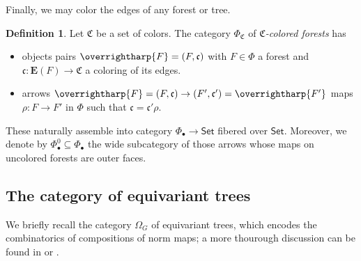 \documentclass[a4paper,10pt
,draft
]{article}%
\numberwithin{equation}{section}
\numberwithin{figure}{section}
\theoremstyle{definition} %
\newtheorem{definition}[equation]{Definition}%
\newcommand{\vect}[1]{\text{\overrightharp{\ensuremath{#1}}}}
\newcommand{\Set}{\ensuremath{\mathsf{Set}}}
\newcommand{\1}{\ensuremath{\mathbbm 1}}%
\begin{document}
Finally, we may color the edges of any forest or tree.
\begin{definition}
      \label{CFOREST_DEF}
      Let $\mathfrak C$ be a set of colors.
      The category $\Phi_{\mathfrak C}$ of \textit{$\mathfrak C$-colored forests} has
      \begin{itemize}
      \item objects pairs $\vect F = (F, \mathfrak c)$ with
            $F \in \Phi$ a forest and
            $\mathfrak c \colon \boldsymbol{E}(F) \to \mathfrak C$ a coloring of its edges.
      \item arrows $\vect F = (F, \mathfrak c) \to (F', \mathfrak c') = \vect{F'}$ maps
            $\rho\colon F \to F'$ in $\Phi$ such that $\mathfrak c = \mathfrak c' \rho$.
      \end{itemize}      

      These naturally assemble into category $\Phi_\bullet \to \Set$ fibered over $\Set$.
      Moreover, we denote by
      $\Phi_\bullet^0 \subseteq \Phi_\bullet$
      the wide subcategory of those arrows whose maps on uncolored forests are outer faces.
\end{definition}

\subsection{The category of equivariant trees}

We briefly recall the category $\Omega_G$ of equivariant trees, which encodes the combinatorics of compositions of norm maps;
a more thourough discussion can be found in \cite{Per18} or \cite[\S 2]{BP_edss}.
\end{document}
